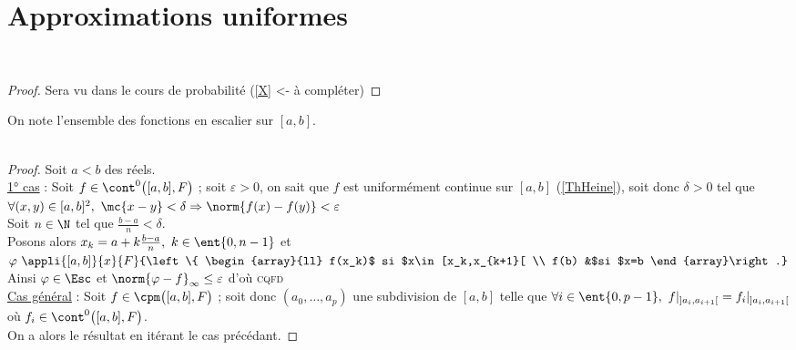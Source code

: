 \section{Approximations uniformes}
    ${}$ \\ 
    \begin{proof}
    Sera vu dans le cours de probabilité (\ref{X} <- à compléter)
    \end{proof}
    On note  l'ensemble des fonctions en escalier sur $[a,b]$.
    \vspace*{0.5cm} \\ 
    \vspace*{0.5cm} \\ 
    \begin{proof}
    Soit $a<b$ des réels. \\ \underline{1° cas} : Soit $f\in\cont^0\big([a,b],F\big)$ ; soit $\varepsilon>0$, on sait que $f$ est uniformément 
    continue sur $[a,b]$ (\ref{ThHeine}), soit donc $\delta>0$ tel que $\forall (x,y)\in[a,b]^2 ,~\mc{x-y}<\delta \Rightarrow 
    \norm{f(x)-f(y)}<\varepsilon$ \\ Soit $n\in\N$ tel que $\frac{b-a}{n}<\delta$. \\ Posons alors $x_k=a+k\frac{b-a}{n} , ~k\in\ent{0,n-1}$ et 
    $\varphi ~\appli{[a,b]}{x}{F}{\left\{ \begin{array}{ll} f(x_k)$ si $x\in[x_k,x_{k+1}[ \\ f(b) &$si $x=b \end{array}\right.}$ \\
    Ainsi $\varphi\in\Esc$ et $\norm{\varphi - f}_{\infty} \leq \varepsilon$ d'où \textsc{cqfd} \vspace*{0.2cm} \\ 
    \underline{Cas général} : Soit $f\in\cpm\big([a,b],F\big)$ ; soit donc $(a_0,\dots ,a_p)$ une subdivision de $[a,b]$ telle que $\forall 
    i\in\ent{0,p-1} , ~ f|_{]a_i,a_{i+1}[} = f_i|_{]a_i,a_{i+1}[}$ où $f_i\in\cont^0\big([a,b],F\big)$. \\
    On a alors le résultat en itérant le cas précédant.
    \end{proof}
    ${}$\hfill {} \hfill ${}$
    \vspace*{0.5cm} \\
    \begin{center}
    \fin
    \end{center}
